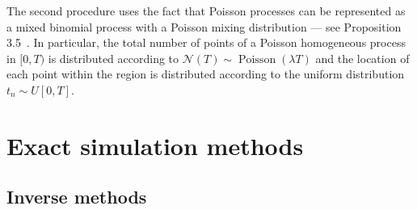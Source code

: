 \documentclass{juliacon}
\numberwithin{equation}{section}
\begin{document}
The second procedure uses the fact that Poisson processes can be represented as a mixed binomial process with a Poisson mixing distribution --- see Proposition 3.5~\cite{last2017}. In particular, the total number of points of a Poisson homogeneous process in \( [0, T) \) is distributed according to \( \mathcal{N} (T) \sim \operatorname{Poisson}( \lambda T ) \) and the location of each point within the region is distributed according to the uniform distribution \( t_n \sim U[0, T] \).




\section{Exact simulation methods} \label{sec:method-exact}

\subsection{Inverse methods} \label{subsec:sim-inverse}
\end{document}
